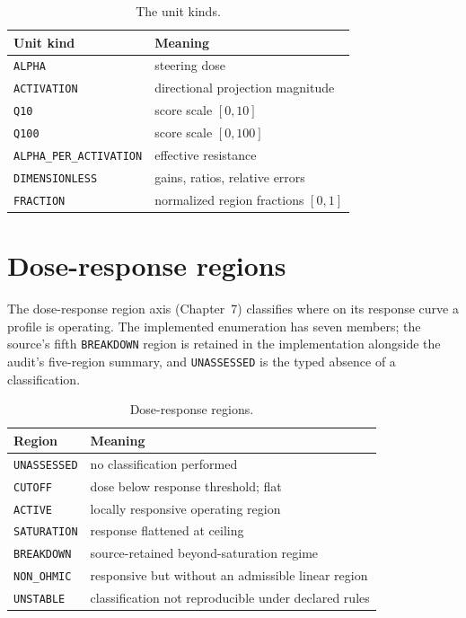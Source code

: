 \begin{table}[htbp]
\centering
\caption{The unit kinds.}\label{enums:tab:units}
\begin{tabular}{@{}ll@{}}
\toprule
Unit kind & Meaning \\
\midrule
\texttt{ALPHA} & steering dose \\
\texttt{ACTIVATION} & directional projection magnitude \\
\texttt{Q10} & score scale $[0,10]$ \\
\texttt{Q100} & score scale $[0,100]$ \\
\texttt{ALPHA\_PER\_ACTIVATION} & effective resistance \\
\texttt{DIMENSIONLESS} & gains, ratios, relative errors \\
\texttt{FRACTION} & normalized region fractions $[0,1]$ \\
\bottomrule
\end{tabular}
\end{table}

\section{Dose-response regions}\label{enums:sec:regions}

The dose-response region axis (Chapter~7) classifies where on its response curve a profile is operating. The implemented enumeration has seven members; the source's fifth \texttt{BREAKDOWN} region is retained in the implementation alongside the audit's five-region summary, and \texttt{UNASSESSED} is the typed absence of a classification.

\begin{table}[htbp]
\centering
\caption{Dose-response regions.}\label{enums:tab:regions}
\begin{tabular}{@{}ll@{}}
\toprule
Region & Meaning \\
\midrule
\texttt{UNASSESSED} & no classification performed \\
\texttt{CUTOFF} & dose below response threshold; flat \\
\texttt{ACTIVE} & locally responsive operating region \\
\texttt{SATURATION} & response flattened at ceiling \\
\texttt{BREAKDOWN} & source-retained beyond-saturation regime \\
\texttt{NON\_OHMIC} & responsive but without an admissible linear region \\
\texttt{UNSTABLE} & classification not reproducible under declared rules \\
\bottomrule
\end{tabular}
\end{table}

